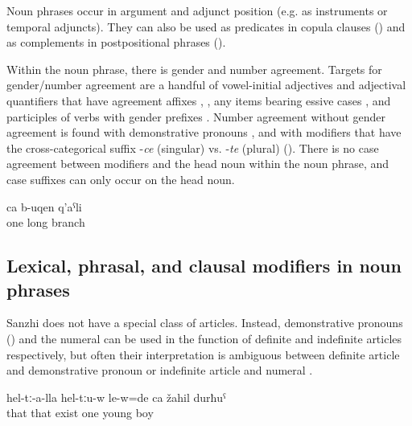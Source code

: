 Noun phrases occur in argument and adjunct position (e.g. as instruments or temporal adjuncts). They can also be used as predicates in copula clauses () and as complements in postpositional phrases ().

Within the noun phrase, there is gender and number agreement. Targets for gender\slash number agreement are a handful of vowel-initial adjectives  and adjectival quantifiers that have agreement affixes , , any items bearing essive cases ,  and participles of verbs with gender prefixes . Number agreement without gender agreement is found with demonstrative pronouns , and with modifiers that have the cross-categorical suffix -\textit{ce} (singular)  vs. -\textit{te}  (plural) (). There is no case agreement between modifiers and the head noun within the noun phrase, and case suffixes can only occur on the head noun.
%
\begin{exe}
	\ex	\label{ex:a/one long branch@1}
	\gll	ca	b-uqen	q'aˁli\\
		one	long	branch\\
	\glt	{}
\end{exe}



\subsection{Lexical, phrasal, and clausal modifiers in noun phrases}
\label{ssec:Lexical, phrasal, and clausal modifiers in noun phrases}

Sanzhi does not have a special class of articles. Instead, demonstrative pronouns () and the numeral   can be used in the function of definite and indefinite articles respectively, but often their interpretation is ambiguous between definite article and demonstrative pronoun or indefinite article and numeral .
%
\begin{exe}
	\ex	\label{ex:There with them was also a / one young boy@2}
	\gll	hel-tː-a-lla	hel-tːu-w	le-w=de	ca	žahil	durħuˁ\\
		that	that	exist	one	young	boy\\
	\glt	{} 
\end{exe}

